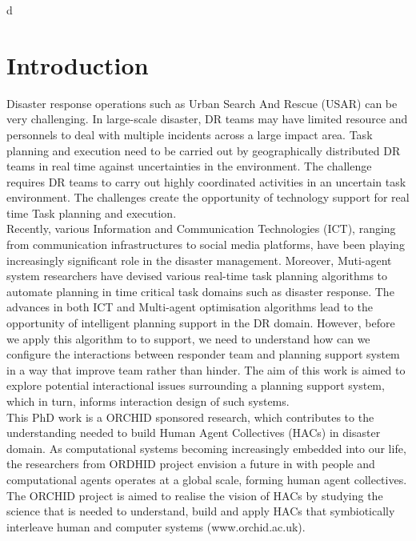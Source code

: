 d\chapter{Introduction}\label{ch:introduction}
Disaster response operations such as Urban Search And Rescue (USAR) can be very challenging. In large-scale disaster, DR teams may have limited resource and personnels to deal with multiple incidents across a large impact area. Task planning and execution need to be carried out by geographically distributed DR teams in real time against uncertainties in the environment. The challenge requires DR teams to carry out highly coordinated activities in an uncertain task environment. The challenges create the opportunity of technology support for real time Task planning and execution.  \\ 

Recently, various Information and Communication Technologies (ICT), ranging from communication infrastructures to social media platforms, have been playing increasingly significant role in the disaster management.  Moreover, Muti-agent system researchers have devised various real-time task planning algorithms to automate planning in time critical task domains such as disaster response. The advances in both ICT and Multi-agent optimisation algorithms lead to the opportunity of intelligent planning support in the DR domain. However, before we apply this algorithm to to support, we need to understand how can we configure the interactions between responder team and planning support system in a way that improve team rather than hinder. The aim of this work is aimed to explore potential interactional issues surrounding a planning support system, which in turn, informs interaction design of such systems. \\

This PhD work is a ORCHID sponsored research, which contributes to the understanding needed to build Human Agent Collectives (HACs) in disaster domain. As computational systems  becoming increasingly embedded into our life, the researchers from ORDHID project envision a future in with people and computational agents operates at a global scale, forming human agent collectives. The ORCHID project is aimed to realise the vision of HACs by studying the science that is needed to understand, build and apply HACs that symbiotically interleave human and computer systems (www.orchid.ac.uk).\\

